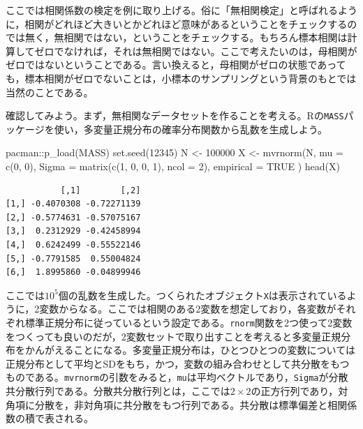 \documentclass[
  a4paper,
]{ltjsbook}
\newenvironment{Shaded}{\begin{snugshade}}{\end{snugshade}}
\newcommand{\AttributeTok}[1]{\textcolor[rgb]{0.40,0.45,0.13}{#1}}
\newcommand{\ConstantTok}[1]{\textcolor[rgb]{0.56,0.35,0.01}{#1}}
\newcommand{\DecValTok}[1]{\textcolor[rgb]{0.68,0.00,0.00}{#1}}
\newcommand{\FunctionTok}[1]{\textcolor[rgb]{0.28,0.35,0.67}{#1}}
\newcommand{\NormalTok}[1]{\textcolor[rgb]{0.00,0.23,0.31}{#1}}
\newcommand{\OtherTok}[1]{\textcolor[rgb]{0.00,0.23,0.31}{#1}}
\newcommand{\SpecialCharTok}[1]{\textcolor[rgb]{0.37,0.37,0.37}{#1}}
\begin{document}
ここでは相関係数の検定を例に取り上げる。俗に「無相関検定」と呼ばれるように，相関がどれほど大きいとかどれほど意味があるということをチェックするのでは無く，無相関ではない，ということをチェックする。もちろん標本相関は計算してゼロでなければ，それは無相関ではない。ここで考えたいのは，母相関がゼロではないということである。言い換えると，母相関がゼロの状態であっても，標本相関がゼロでないことは，小標本のサンプリングという背景のもとでは当然のことである。

確認してみよう。まず，無相関なデータセットを作ることを考える。Rの\texttt{MASS}パッケージを使い，多変量正規分布の確率分布関数から乱数を生成しよう。

\begin{Shaded}
\begin{Highlighting}[]
\NormalTok{pacman}\SpecialCharTok{::}\FunctionTok{p\_load}\NormalTok{(MASS)}
\FunctionTok{set.seed}\NormalTok{(}\DecValTok{12345}\NormalTok{)}
\NormalTok{N }\OtherTok{\textless{}{-}} \DecValTok{100000}
\NormalTok{X }\OtherTok{\textless{}{-}} \FunctionTok{mvrnorm}\NormalTok{(N,}
  \AttributeTok{mu =} \FunctionTok{c}\NormalTok{(}\DecValTok{0}\NormalTok{, }\DecValTok{0}\NormalTok{),}
  \AttributeTok{Sigma =} \FunctionTok{matrix}\NormalTok{(}\FunctionTok{c}\NormalTok{(}\DecValTok{1}\NormalTok{, }\DecValTok{0}\NormalTok{, }\DecValTok{0}\NormalTok{, }\DecValTok{1}\NormalTok{), }\AttributeTok{ncol =} \DecValTok{2}\NormalTok{),}
  \AttributeTok{empirical =} \ConstantTok{TRUE}
\NormalTok{)}
\FunctionTok{head}\NormalTok{(X)}
\end{Highlighting}
\end{Shaded}

\begin{verbatim}
           [,1]        [,2]
[1,] -0.4070308 -0.72271139
[2,] -0.5774631 -0.57075167
[3,]  0.2312929 -0.42458994
[4,]  0.6242499 -0.55522146
[5,] -0.7791585  0.55004824
[6,]  1.8995860 -0.04899946
\end{verbatim}

ここでは\ensuremath{10^{5}}個の乱数を生成した。つくられたオブジェクト\texttt{X}は表示されているように，2変数からなる。ここでは相関のある2変数を想定しており，各変数がそれぞれ標準正規分布に従っているという設定である。\texttt{rnorm}関数を2つ使って2変数をつくっても良いのだが，2変数セットで取り出すことを考えると多変量正規分布をかんがえることになる。多変量正規分布は，ひとつひとつの変数については正規分布として平均とSDをもち，かつ，変数の組み合わせとして共分散をもつものである。\texttt{mvrnorm}の引数をみると，\texttt{mu}は平均ベクトルであり，\texttt{Sigma}が分散共分散行列である。分散共分散行列とは，ここでは\(2\times 2\)の正方行列であり，対角項に分散を，非対角項に共分散をもつ行列である。共分散は標準偏差と相関係数の積で表される。
\end{document}
